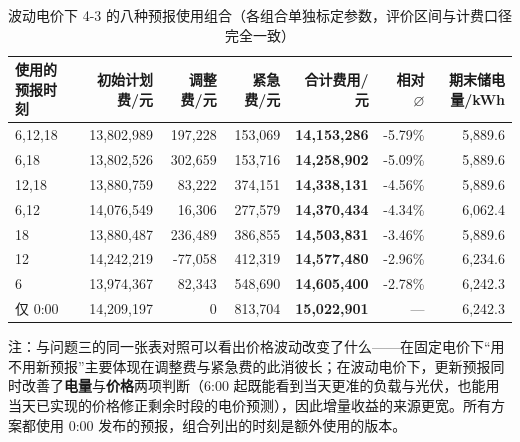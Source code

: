\begin{table}[htbp]
  \centering
  \caption{波动电价下 4-3 的八种预报使用组合（各组合单独标定参数，评价区间与计费口径完全一致）}
  \label{tab:p4-combo}
  \small
  \begin{tabular}{lrrrrrr}
    \toprule
    使用的预报时刻 & 初始计划费/元 & 调整费/元 & 紧急费/元 & 合计费用/元 & 相对 $\varnothing$ & 期末储电量/kWh \\
    \midrule
    {6,12,18} & 13,802,989 & 197,228 & 153,069 & \textbf{14,153,286} & -5.79\% & 5,889.6 \\
    {6,18} & 13,802,526 & 302,659 & 153,716 & \textbf{14,258,902} & -5.09\% & 5,889.6 \\
    {12,18} & 13,880,759 & 83,222 & 374,151 & \textbf{14,338,131} & -4.56\% & 5,889.6 \\
    {6,12} & 14,076,549 & 16,306 & 277,579 & \textbf{14,370,434} & -4.34\% & 6,062.4 \\
    {18} & 13,880,487 & 236,489 & 386,855 & \textbf{14,503,831} & -3.46\% & 5,889.6 \\
    {12} & 14,242,219 & -77,058 & 412,319 & \textbf{14,577,480} & -2.96\% & 6,234.6 \\
    {6} & 13,974,367 & 82,343 & 548,690 & \textbf{14,605,400} & -2.78\% & 6,242.3 \\
    仅 0:00 & 14,209,197 & 0 & 813,704 & \textbf{15,022,901} & --- & 6,242.3 \\
    \bottomrule
  \end{tabular}
  \par\vspace{2pt}
  \begin{minipage}{\textwidth}\footnotesize
    注：与问题三的同一张表对照可以看出价格波动改变了什么——在固定电价下``用不用新预报''主要体现在调整费与紧急费的此消彼长；在波动电价下，更新预报同时改善了\textbf{电量}与\textbf{价格}两项判断（6:00 起既能看到当天更准的负载与光伏，也能用当天已实现的价格修正剩余时段的电价预测），因此增量收益的来源更宽。所有方案都使用 0:00 发布的预报，组合列出的时刻是额外使用的版本。
  \end{minipage}
\end{table}

